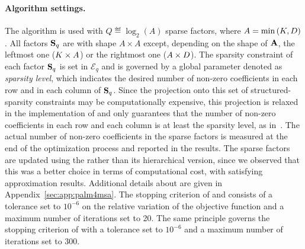 \paragraph{Algorithm settings.} 
The \qkmeans algorithm is used with $Q\eqdef\log_2\left (A\right )$ sparse factors, where  $A=\min\left (K, D\right )$. 
All factors ${\mathbf{S}}_q$ are with shape $A \times A$ except, depending on the shape of ${\mathbf{A}}$, the leftmost one ($K\times A$) or the rightmost one ($A\times D$). 
The sparsity constraint of each factor ${\mathbf{S}}_q$ is set in $\mathcal{E}_q$ and is governed by a global parameter denoted as \textit{sparsity level}, which indicates the desired number of non-zero coefficients in each row and in each column of ${\mathbf{S}}_q$. 
Since the projection onto this set of structured-sparsity constraints may be computationally expensive, this projection is relaxed in the implementation of \palm and only guarantees that the number of non-zero coefficients in each row and each column is at least the sparsity level, as in~\cite{LeMagoarou2016Flexible}.
The actual number of non-zero coefficients in the sparse factors is measured at the end of the optimization process and reported in the results.
The sparse factors are updated using the \palm rather than its hierarchical version, since we observed that this was a better choice in terms of computational cost, with satisfying approximation results.
Additional details about \palm are given in Appendix~\ref{sec:app:palm4msa}.
The stopping criterion of \kmeans and \qkmeans consists of a tolerance set to $10^{-6}$ on the relative variation of the objective function and a maximum number of iterations set to 20. The same principle governs the stopping criterion of \palm with a tolerance set to $10^{-6}$ and a maximum number of iterations set to 300.

%


